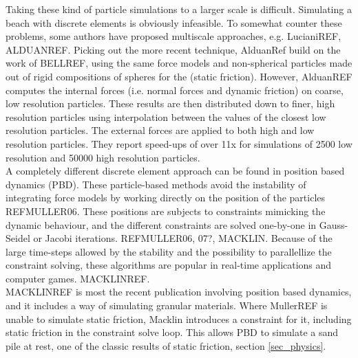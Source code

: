 Taking these kind of particle simulations to a larger scale is difficult. Simulating a beach with discrete elements is obviously infeasible. To somewhat counter these problems, some authors have proposed multiscale approaches, e.g. LucianiREF, ALDUANREF. Picking out the more recent technique, AlduanRef build on the work of BELLREF, using the same force models and non-spherical particles made out of rigid compositions of spheres for the (static friction). However, AlduanREF computes the internal forces (i.e. normal forces and dynamic friction) on coarse, low resolution particles. These results are then distributed down to finer, high resolution particles using interpolation between the values of the closest low resolution particles. The external forces are applied to both high and low resolution particles. They report speed-ups of over 11x for simulations of 2500 low resolution and 50000 high resolution particles.\\

A completely different discrete element approach can be found in position based dynamics (PBD). These particle-based methods avoid the instability of integrating force models by working directly on the position of the particles REFMULLER06. These positions are subjects to constraints mimicking the dynamic behaviour, and the different constraints are solved one-by-one in Gauss-Seidel or Jacobi iterations. REFMULLER06, 07?, MACKLIN. Because of the large time-steps allowed by the stability and the possibility to parallellize the constraint solving, these algorithms are popular in real-time applications and computer games. MACKLINREF.\\

MACKLINREF is most the recent publication involving position based dynamics, and it includes a way of simulating granular materials. Where MullerREF is unable to simulate static friction, Macklin introduces a constraint for it, including static friction in the constraint solve loop. This allows PBD to simulate a sand pile at rest, one of the classic results of static friction, section \ref{sec_physics}.\\


